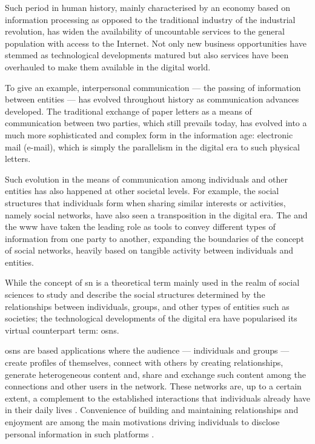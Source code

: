 \documentclass[showtrims, oldfontcommands]{kthesis}
\begin{document}
Such period in human history, mainly characterised by an economy based on information 
processing as opposed to the traditional industry of the industrial revolution, 
has widen the availability of uncountable services to the general population with 
access to the Internet. Not only new business opportunities have stemmed as technological 
developments matured but also services have been overhauled to make them available 
in the digital world.

To give an example, interpersonal communication --- the passing of information between 
entities --- has evolved throughout history as communication advances developed. 
The traditional exchange of paper letters as a means of communication between two 
parties, which still prevails today, has evolved into a much more sophisticated 
and complex form in the information age: electronic mail (e-mail), which is simply 
the parallelism in the digital era to such physical letters.

Such evolution in the means of communication among individuals and other entities 
has also happened at other societal levels. For example, the social structures that 
individuals form when sharing similar interests or activities, namely social networks, 
have also seen a transposition in the digital era. The \Internet and the \ac{www} 
have taken the leading role as tools to convey different types of information from 
one party to another, expanding the boundaries of the concept of social networks, 
heavily based on tangible activity between individuals and entities.

While the concept of \acl{sn} is a theoretical term mainly used in the realm of 
social sciences to study and describe the social structures determined by the relationships 
between individuals, groups, and other types of entities such as societies; the 
technological developments of the digital era have popularised its virtual counterpart 
term: \aclp{osn}.

\Acp{osn} are \Internet based applications where the audience --- individuals and 
groups --- create profiles of themselves, connect with others by creating relationships, 
generate heterogeneous content and, share and exchange such content among the connections 
and other users in the network. These networks are, up to a certain extent, a complement 
to the established interactions that individuals already have in their daily lives 
\cite{SubrahmanyamRWE08}. Convenience of building and maintaining relationships 
and enjoyment are among the main motivations driving individuals to disclose personal 
information in such platforms \cite{KrasnovaSKH10}.
\end{document}
